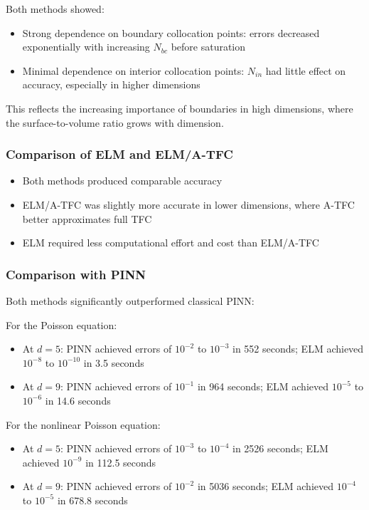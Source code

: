 \documentclass[11pt]{article}
\begin{document}
Both methods showed:
\begin{itemize}
    \item Strong dependence on boundary collocation points: errors decreased exponentially with increasing $N_{bc}$ before saturation
    \item Minimal dependence on interior collocation points: $N_{in}$ had little effect on accuracy, especially in higher dimensions
\end{itemize}

This reflects the increasing importance of boundaries in high dimensions, where the surface-to-volume ratio grows with dimension.

\subsubsection{Comparison of ELM and ELM/A-TFC}

\begin{itemize}
    \item Both methods produced comparable accuracy
    \item ELM/A-TFC was slightly more accurate in lower dimensions, where A-TFC better approximates full TFC
    \item ELM required less computational effort and cost than ELM/A-TFC
\end{itemize}

\subsubsection{Comparison with PINN}

Both methods significantly outperformed classical PINN:

For the Poisson equation:
\begin{itemize}
    \item At $d=5$: PINN achieved errors of $10^{-2}$ to $10^{-3}$ in 552 seconds; ELM achieved $10^{-8}$ to $10^{-10}$ in 3.5 seconds
    \item At $d=9$: PINN achieved errors of $10^{-1}$ in 964 seconds; ELM achieved $10^{-5}$ to $10^{-6}$ in 14.6 seconds
\end{itemize}

For the nonlinear Poisson equation:
\begin{itemize}
    \item At $d=5$: PINN achieved errors of $10^{-3}$ to $10^{-4}$ in 2526 seconds; ELM achieved $10^{-9}$ in 112.5 seconds
    \item At $d=9$: PINN achieved errors of $10^{-2}$ in 5036 seconds; ELM achieved $10^{-4}$ to $10^{-5}$ in 678.8 seconds
\end{itemize}
\end{document}
